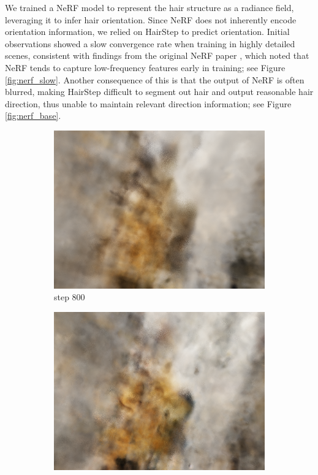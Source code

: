 \documentclass[12pt]{article}
\begin{document}
We trained a NeRF model to represent the hair structure as a radiance field, leveraging it to infer hair orientation. Since NeRF does not inherently encode orientation information, we relied on HairStep to predict orientation. Initial observations showed a slow convergence rate when training in highly detailed scenes, consistent with findings from the original NeRF paper \cite{mildenhall_nerf_2020}, which noted that NeRF tends to capture low-frequency features early in training; see Figure \ref{fig:nerf_slow}. Another consequence of this is that the output of NeRF is often blurred, making HairStep difficult to segment out hair and output reasonable hair direction, thus unable to maintain relevant direction information; see Figure \ref{fig:nerf_base}.
\begin{figure}[h]
	\centering
	\begin{subfigure}{0.3\textwidth}
		\centering
		\includegraphics[width=\textwidth]{./images/nerf_pred/nerf_800.png}
		\caption{step 800}
	\end{subfigure}
	\hfill
	\begin{subfigure}{0.3\textwidth}
		\centering
		\includegraphics[width=\textwidth]{./images/nerf_pred/nerf_4000.png}

\end{subfigure}
\end{figure}
\end{document}
